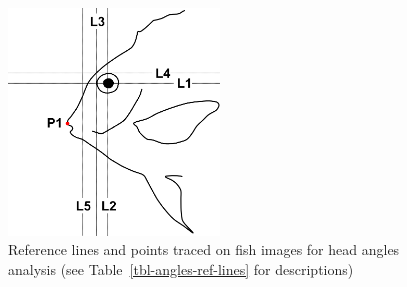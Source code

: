 \documentclass[
  letterpaper,
  DIV=11,
  numbers=noendperiod,
  oneside]{scrreprt}
\begin{document}
\begin{figure}

{\centering \includegraphics[width=0.5\textwidth,height=\textheight]{./images/drawings/head_ref_lines_sketch.png}

}

\caption{\label{fig-angles-ref-lines}Reference lines and points traced
on fish images for head angles analysis (see
Table~\ref{tbl-angles-ref-lines} for descriptions)}

\end{figure}
\end{document}
